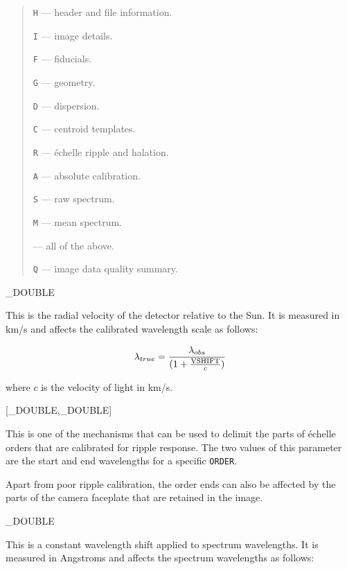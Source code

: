 {{   \begin {quote}
   \begin {description}
      \item {\tt H} --- header and file information.
      \item {\tt I} --- image details.
      \item {\tt F} --- fiducials.
      \item {\tt G} --- geometry.
      \item {\tt D} --- dispersion.
      \item {\tt C} --- centroid templates.
      \item {\tt R} --- \'{e}chelle ripple and halation.
      \item {\tt A} --- absolute calibration.
      \item {\tt S} --- raw spectrum.
      \item {\tt M} --- mean spectrum.
      \item {\tt *} --- all of the above.
      \item {\tt Q} --- image data quality summary.
   \end {description}
   \end {quote}
}

{
   \_DOUBLE
}{
   This is the radial velocity of the detector relative to the Sun.
   It is measured in km/s and affects the calibrated wavelength
   scale as follows:

   \begin {equation}
      \lambda_{true} = \frac{\lambda_{obs}}
                            {(1 + \frac{\rm VSHIFT}{c})}
   \end {equation}

   where $c$ is the velocity of light in km/s.
}

{
   [\_DOUBLE,\_DOUBLE]
}{
   This is one of the mechanisms that can be used to delimit the
   parts of \'{e}chelle orders that are calibrated for ripple response.
   The two values of this parameter are the start and end wavelengths
   for a specific \verb+ORDER+\@.

   Apart from poor ripple calibration, the order ends can also be affected
   by the parts of the camera faceplate that are retained in the image.
}

{
   \_DOUBLE
}{
   This is a constant wavelength shift applied to spectrum wavelengths.
   It is measured in Angstroms and affects the spectrum wavelengths as follows:

}}
